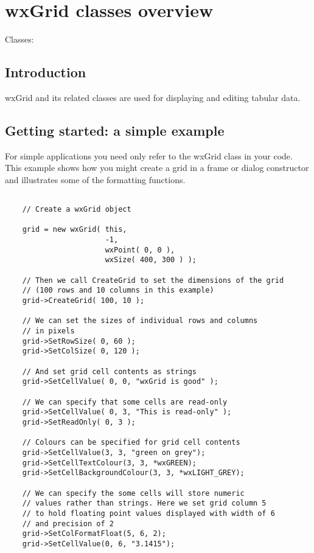 \section{wxGrid classes overview}\label{gridoverview}

Classes: 

\subsection{Introduction}\label{introductiontowxgrid}
wxGrid and its related classes are used for displaying and editing tabular data.

\subsection{Getting started: a simple example}\label{simplewxgridexample}
For simple applications you need only refer to the wxGrid class in your
code.  This example shows how you might create a grid in a frame or
dialog constructor and illustrates some of the formatting functions. 

\begin{verbatim}

    // Create a wxGrid object
    
    grid = new wxGrid( this,
                       -1,
                       wxPoint( 0, 0 ),
                       wxSize( 400, 300 ) );

    // Then we call CreateGrid to set the dimensions of the grid
    // (100 rows and 10 columns in this example)
    grid->CreateGrid( 100, 10 );

    // We can set the sizes of individual rows and columns
    // in pixels
    grid->SetRowSize( 0, 60 );
    grid->SetColSize( 0, 120 );
    
    // And set grid cell contents as strings
    grid->SetCellValue( 0, 0, "wxGrid is good" );

    // We can specify that some cells are read-only
    grid->SetCellValue( 0, 3, "This is read-only" );
    grid->SetReadOnly( 0, 3 );

    // Colours can be specified for grid cell contents
    grid->SetCellValue(3, 3, "green on grey");
    grid->SetCellTextColour(3, 3, *wxGREEN);
    grid->SetCellBackgroundColour(3, 3, *wxLIGHT_GREY);

    // We can specify the some cells will store numeric 
    // values rather than strings. Here we set grid column 5 
    // to hold floating point values displayed with width of 6 
    // and precision of 2
    grid->SetColFormatFloat(5, 6, 2);
    grid->SetCellValue(0, 6, "3.1415");

\end{verbatim}

